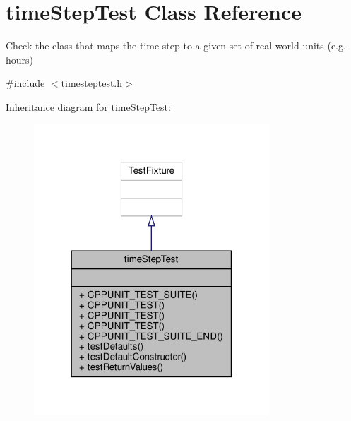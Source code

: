 \hypertarget{classtimeStepTest}{}\section{time\+Step\+Test Class Reference}
\label{classtimeStepTest}


Check the class that maps the time step to a given set of real-\/world units (e.\+g. hours)  




{\ttfamily \#include $<$timesteptest.\+h$>$}



Inheritance diagram for time\+Step\+Test\+:\nopagebreak
\begin{figure}[H]
\begin{center}
\leavevmode
\includegraphics[width=250pt]{classtimeStepTest__inherit__graph}
\end{center}
\end{figure}


